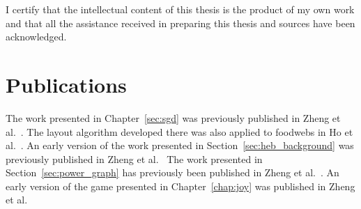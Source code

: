 I certify that the intellectual content of this thesis is the product of my own work and that all the assistance received in preparing this thesis and sources have been acknowledged.

\section{Publications}

The work presented in Chapter~\ref{sec:sgd} was previously published in Zheng et al.\ \cite{Zheng2019Stochastic}. The layout algorithm developed there was also applied to foodwebs in Ho et al.\ \cite{Ho2019}.
An early version of the work presented in Section~\ref{sec:heb_background} was previously published in Zheng et al.\ \cite{Zheng2018}
The work presented in Section~\ref{sec:power_graph} has previously been published in Zheng et al.\ \cite{Zheng2019Power}.
An early version of the game presented in Chapter~\ref{chap:joy} was published in Zheng et al.\ \cite{Zheng2019Eco}